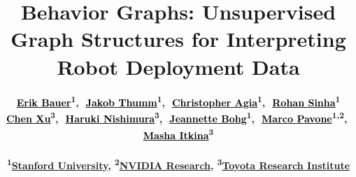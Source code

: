 \documentclass[letterpaper, 10 pt, conference]{ieeeconf}
\begin{document}
\nocite{IEEEexample:BSTcontrol}
\title{\LARGE \bf Behavior Graphs: Unsupervised Graph Structures for Interpreting Robot Deployment Data}



\newcommand{\authorhref}[3][black]{\href{#2}{\textcolor{#1}{#3}}}
\author{
    \bfseries
    \authorhref{http://erikbr01.github.io/}{Erik Bauer}\textsuperscript{1},\,\,
    \authorhref{https://jakob-thumm.com/}{Jakob Thumm}\textsuperscript{1},\,\,
    \authorhref{http://agiachris.github.io/}{Christopher Agia}\textsuperscript{1},\,\,
    \authorhref{https://rohansinha.nl/}{Rohan Sinha}\textsuperscript{1}\\ \bfseries
    \authorhref{https://hamrel-cxu.github.io/}{Chen Xu}\textsuperscript{3},\,\,
    \authorhref{https://harukins.github.io/}{Haruki Nishimura}\textsuperscript{3},\,\,
    \authorhref{https://web.stanford.edu/~bohg/}{Jeannette Bohg}\textsuperscript{1},\,\,
    \authorhref{https://profiles.stanford.edu/marco-pavone}{Marco Pavone}\textsuperscript{1,2},\,\,
    \authorhref{https://mashaitkina.weebly.com/}{Masha Itkina}\textsuperscript{3}\\\vspace{-8pt}\\
    \textsuperscript{1}\href{https://www.stanford.edu/}{Stanford University},
    \textsuperscript{2}\href{https://www.nvidia.com/en-us/research/}{NVIDIA Research},
    \textsuperscript{3}\href{https://www.tri.global/}{Toyota Research Institute}
}%

\maketitle
\end{document}
